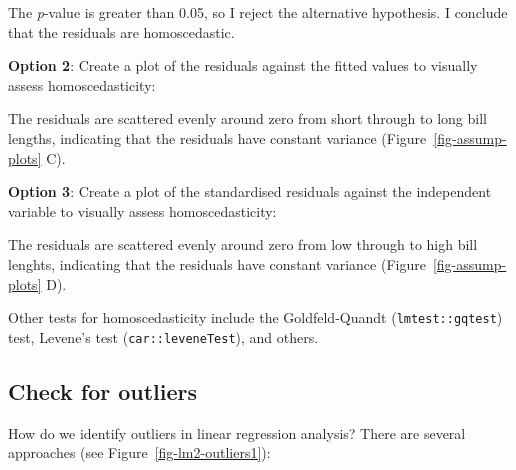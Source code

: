 \documentclass[
  letterpaper,
]{book}
\begin{document}
The \emph{p}-value is greater than 0.05, so I reject the alternative
hypothesis. I conclude that the residuals are homoscedastic.

\textbf{Option 2}: Create a plot of the residuals against the fitted
values to visually assess homoscedasticity:

The residuals are scattered evenly around zero from short through to
long bill lengths, indicating that the residuals have constant variance
(Figure~\ref{fig-assump-plots} C).

\textbf{Option 3}: Create a plot of the standardised residuals against
the independent variable to visually assess homoscedasticity:

The residuals are scattered evenly around zero from low through to high
bill lenghts, indicating that the residuals have constant variance
(Figure~\ref{fig-assump-plots} D).

Other tests for homoscedasticity include the Goldfeld-Quandt
(\texttt{lmtest::gqtest}) test, Levene's test
(\texttt{car::leveneTest}), and others.

\subsection{Check for outliers}\label{sec-outlier-test}

How do we identify outliers in linear regression analysis? There are
several approaches (see Figure~\ref{fig-lm2-outliers1}):
\end{document}
